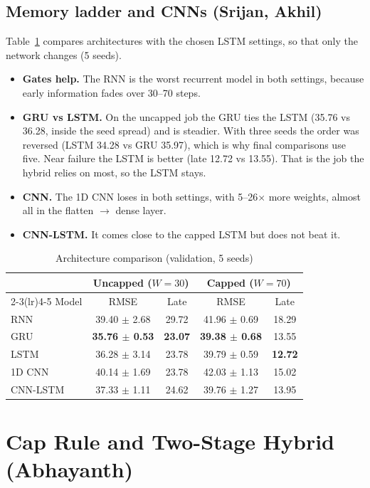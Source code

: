 \documentclass[conference]{IEEEtran}
\begin{document}
\subsection{Memory ladder and CNNs (Srijan, Akhil)}
Table~\ref{tab:ladder} compares architectures with the chosen LSTM settings, so that only the network changes (5 seeds).
\begin{itemize}
  \item \textbf{Gates help.} The RNN is the worst recurrent model in both settings, because early information fades over 30--70 steps.
  \item \textbf{GRU vs LSTM.} On the uncapped job the GRU ties the LSTM (35.76 vs 36.28, inside the seed spread) and is steadier. With three seeds the order was reversed (LSTM 34.28 vs GRU 35.97), which is why final comparisons use five. Near failure the LSTM is better (late 12.72 vs 13.55). That is the job the hybrid relies on most, so the LSTM stays.
  \item \textbf{CNN.} The 1D CNN loses in both settings, with 5--26$\times$ more weights, almost all in the flatten $\to$ dense layer.
  \item \textbf{CNN-LSTM.} It comes close to the capped LSTM but does not beat it.
\end{itemize}

\begin{table}[t]
\centering
\caption{Architecture comparison (validation, 5 seeds)}
\label{tab:ladder}
\setlength{\tabcolsep}{4pt}
\begin{tabular}{@{}lcccc@{}}
\toprule
 & \multicolumn{2}{c}{Uncapped ($W=30$)} & \multicolumn{2}{c}{Capped ($W=70$)} \\
\cmidrule(lr){2-3}\cmidrule(lr){4-5}
Model & RMSE & Late & RMSE & Late \\
\midrule
RNN & 39.40 $\pm$ 2.68 & 29.72 & 41.96 $\pm$ 0.69 & 18.29 \\
GRU & \textbf{35.76 $\pm$ 0.53} & \textbf{23.07} & \textbf{39.38 $\pm$ 0.68} & 13.55 \\
LSTM & 36.28 $\pm$ 3.14 & 23.78 & 39.79 $\pm$ 0.59 & \textbf{12.72} \\
1D CNN & 40.14 $\pm$ 1.69 & 23.78 & 42.03 $\pm$ 1.13 & 15.02 \\
CNN-LSTM & 37.33 $\pm$ 1.11 & 24.62 & 39.76 $\pm$ 1.27 & 13.95 \\
\bottomrule
\end{tabular}
\end{table}

\section{Cap Rule and Two-Stage Hybrid (Abhayanth)}
\label{sec:hybrid}
\end{document}
